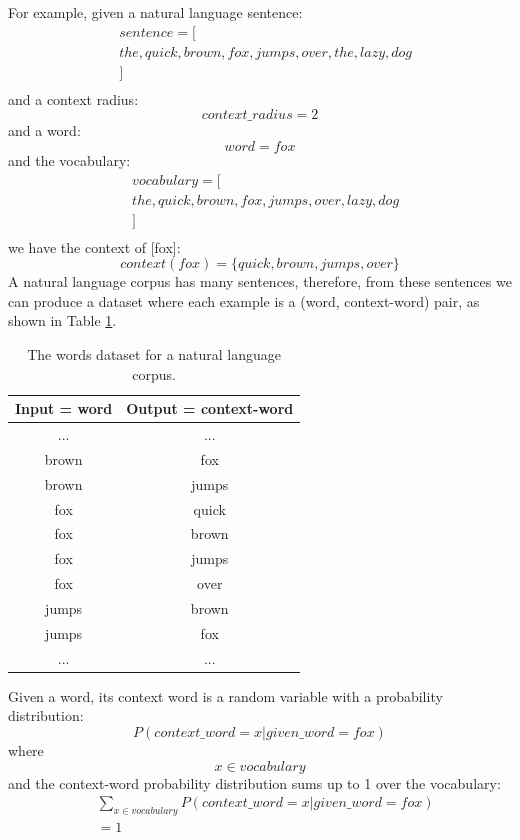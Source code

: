 \documentclass[conference]{IEEEtran}
\begin{document}
For example, given a natural language sentence:
\begin{align*}
	&sentence = [\\
	&the, quick, brown, fox, jumps, over, the, lazy, dog\\
	&]\\
\end{align*}
and a context radius:
\[context\_radius = 2\]
and a word:
\[word = fox\]
and the vocabulary:
\begin{align*}
	&vocabulary = [\\
	&the, quick, brown, fox, jumps, over, lazy, dog\\
	&]\\
\end{align*}
we have the context of [fox]:
\[ context(fox) = \{quick, brown, jumps, over\} \]
A natural language corpus has many sentences,
therefore, from these sentences we can produce a dataset where each example is a (word, context-word) pair,
as shown in Table \ref{tab:words}.
\begin{table}[!ht]
	\centering
	\caption{The words dataset for a natural language corpus.}
	\begin{tabular}{cc} \hline \rowcolor{blue!30}
		Input = word & Output = context-word \\ \hline
		... & ...       \\ \hline
		brown & fox \\ \hline
		brown & jumps \\ \hline
		fox & quick \\ \hline
		fox & brown \\ \hline
		fox & jumps \\ \hline
		fox & over \\ \hline
		jumps & brown \\ \hline
		jumps & fox \\ \hline
		... & ...       \\ \hline
	\end{tabular}
	\label{tab:words}
\end{table}
Given a word, its context word is a random variable with a probability distribution:
\[P(context\_word = x | given\_word = fox)\]
where
\[x \in vocabulary\]
and the context-word probability distribution sums up to 1 over the vocabulary:
\begin{align*}
	&\sum_{x \in vocabulary}P(context\_word = x | given\_word = fox)\\
	&= 1\\
\end{align*}
\end{document}
